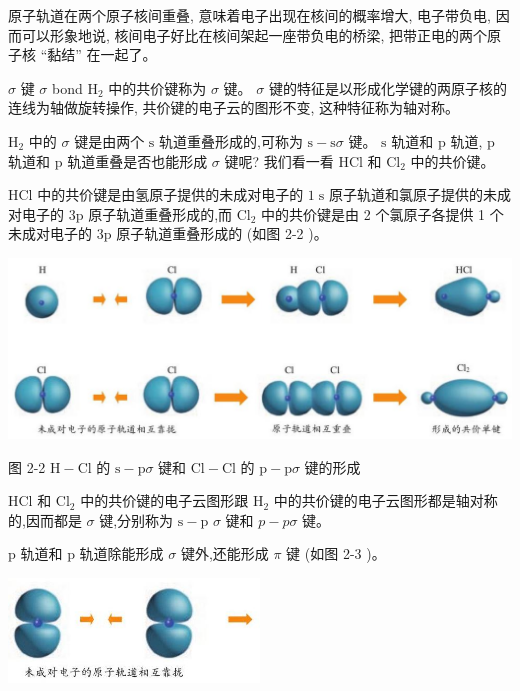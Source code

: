 \documentclass[10pt]{article}
\begin{document}
原子轨道在两个原子核间重叠, 意味着电子出现在核间的概率增大, 电子带负电, 因而可以形象地说, 核间电子好比在核间架起一座带负电的桥梁, 把带正电的两个原子核 “黏结” 在一起了。

\(\sigma\) 键 \(\sigma\) bond \({\mathrm{H}}_{2}\) 中的共价键称为 \(\sigma\) 键。 \(\sigma\) 键的特征是以形成化学键的两原子核的连线为轴做旋转操作, 共价键的电子云的图形不变, 这种特征称为轴对称。

\({\mathrm{H}}_{2}\) 中的 \(\sigma\) 键是由两个 \(\mathrm{s}\) 轨道重叠形成的,可称为 \(\mathrm{s} - \mathrm{s}\sigma\) 键。 \(\mathrm{s}\) 轨道和 \(\mathrm{p}\) 轨道, \(\mathrm{p}\) 轨道和 \(\mathrm{p}\) 轨道重叠是否也能形成 \(\sigma\) 键呢? 我们看一看 \(\mathrm{{HCl}}\) 和 \({\mathrm{{Cl}}}_{2}\) 中的共价键。

\(\mathrm{{HCl}}\) 中的共价键是由氢原子提供的未成对电子的 \(1\mathrm{\;s}\) 原子轨道和氯原子提供的未成对电子的 \(3\mathrm{p}\) 原子轨道重叠形成的,而 \({\mathrm{{Cl}}}_{2}\) 中的共价键是由 2 个氯原子各提供 1 个未成对电子的 \(3\mathrm{p}\) 原子轨道重叠形成的 (如图 2-2 )。

\begin{center}
\includegraphics[max width=1.0\textwidth]{images/0190e026-5a11-7df7-bd27-54d09026ba7a_38_901976.jpg}
\end{center}

图 2-2 \(\mathrm{H} - \mathrm{{Cl}}\) 的 \(\mathrm{s} - \mathrm{p}\sigma\) 键和 \(\mathrm{{Cl}} - \mathrm{{Cl}}\) 的 \(\mathrm{p} - \mathrm{p}\sigma\) 键的形成

\(\mathrm{{HCl}}\) 和 \({\mathrm{{Cl}}}_{2}\) 中的共价键的电子云图形跟 \({\mathrm{H}}_{2}\) 中的共价键的电子云图形都是轴对称的,因而都是 \(\sigma\) 键,分别称为 \(\mathrm{s} - \mathrm{p}\) \(\sigma\) 键和 \(p - {p\sigma }\) 键。

\(\mathrm{p}\) 轨道和 \(\mathrm{p}\) 轨道除能形成 \(\sigma\) 键外,还能形成 \(\pi\) 键 (如图 2-3 )。

\begin{center}
\includegraphics[max width=0.5\textwidth]{images/0190e026-5a11-7df7-bd27-54d09026ba7a_38_208591.jpg}
\end{center}
\end{document}
